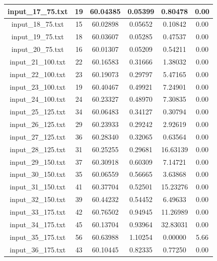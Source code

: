 \begin{center}
\begin{tabular}{|c|c|c|c|c|c|}
		input\_17\_75.txt & 19 & 60.04385 & 0.05399 & 0.80478 & 0.00\\\hline
		input\_18\_75.txt & 15 & 60.02898 & 0.05652 & 0.10842 & 0.00\\\hline
		input\_19\_75.txt & 18 & 60.03607 & 0.05285 & 0.47537 & 0.00\\\hline
		input\_20\_75.txt & 16 & 60.01307 & 0.05209 & 0.54211 & 0.00\\\hline
		input\_21\_100.txt & 22 & 60.16583 & 0.31666 & 1.38032 & 0.00\\\hline
		input\_22\_100.txt & 23 & 60.19073 & 0.29797 & 5.47165 & 0.00\\\hline
		input\_23\_100.txt & 19 & 60.40467 & 0.49921 & 7.24901 & 0.00\\\hline
		input\_24\_100.txt & 24 & 60.23327 & 0.48970 & 7.30835 & 0.00\\\hline
		input\_25\_125.txt & 34 & 60.06483 & 0.34127 & 0.30794 & 0.00\\\hline
		input\_26\_125.txt & 29 & 60.23933 & 0.29242 & 2.92619 & 0.00\\\hline
		input\_27\_125.txt & 36 & 60.28340 & 0.32065 & 0.63564 & 0.00\\\hline
		input\_28\_125.txt & 31 & 60.25255 & 0.29681 & 16.63139 & 0.00\\\hline
		input\_29\_150.txt & 37 & 60.30918 & 0.60309 & 7.14721 & 0.00\\\hline
		input\_30\_150.txt & 35 & 60.06559 & 0.56665 & 3.63868 & 0.00\\\hline
		input\_31\_150.txt & 41 & 60.37704 & 0.52501 & 15.23276 & 0.00\\\hline
		input\_32\_150.txt & 39 & 60.44232 & 0.54452 & 6.49633 & 0.00\\\hline
		input\_33\_175.txt & 42 & 60.76502 & 0.94945 & 11.26989 & 0.00\\\hline
		input\_34\_175.txt & 45 & 60.13704 & 0.93964 & 32.83031 & 0.00\\\hline
		input\_35\_175.txt & 56 & 60.63988 & 1.10254 & 0.00000 & 5.66\\\hline
		input\_36\_175.txt & 43 & 60.10445 & 0.82335 & 0.77250 & 0.00\\\hline
	\end{tabular}
\end{center}

\pagebreak

